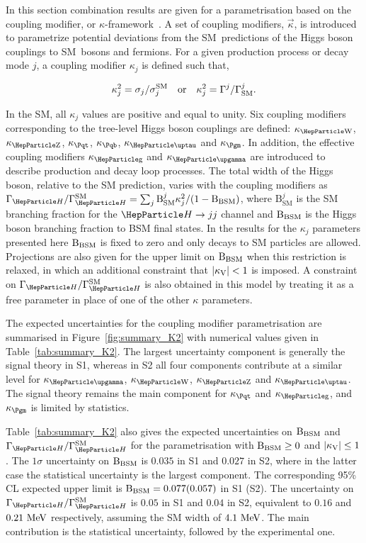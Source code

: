 
In this section combination results are given for a parametrisation based on the coupling modifier, or $\kappa$-framework~\cite{Heinemeyer:2013tqa}. A set of coupling modifiers, $\vec\kappa$, is introduced to parametrize potential deviations from the SM~predictions of the Higgs boson couplings to SM~bosons and fermions. For a given production process or decay mode $j$, a coupling modifier $\kappa_j$ is defined such that,

\begin{equation}
\label{eq:kappa}
  \kappa_j^2=\sigma_j/\sigma_j^\SM\ \ \ {\rm or}\ \ \  \kappa_j^2=\Gamma^j/\Gamma^j_\SM.
\end{equation}

In the SM, all $\kappa_j$ values are positive and equal to unity. Six coupling modifiers corresponding to the tree-level Higgs boson couplings are defined: $\kW$, $\kZ$, $\ktop$, $\kb$, $\ktau$ and $\kmu$. In addition, the effective coupling modifiers $\kglu$ and $\kgam$ are introduced to describe \ggh production and \hgg decay loop processes. The total width of the Higgs boson, relative to the SM prediction, varies with the coupling modifiers as $\GammaSM = \sum_{j}\mathrm{B}^{j}_{\text{SM}}\kappa_{j}^{2} / (1 - \Bbsm)$, where $\mathrm{B}^{j}_{\text{SM}}$ is the SM branching fraction for the $\PH\rightarrow jj$ channel and $\mathrm{B_{BSM}}$ is the Higgs boson branching fraction to BSM final states. In the results for the $\kappa_j$ parameters presented here $\mathrm{B_{BSM}}$ is fixed to zero and only decays to SM particles are allowed. Projections are also given for the upper limit on $\mathrm{B_{BSM}}$ when this restriction is relaxed, in which an additional constraint that $|\kappa_{\mathrm{V}}| < 1$ is imposed. A constraint on $\GammaSM$ is also obtained in this model by treating it as a free parameter in place of one of the other $\kappa$ parameters.

The expected uncertainties for the coupling modifier parametrisation are summarised in Figure~\ref{fig:summary_K2} with numerical values given in Table~\ref{tab:summary_K2}. The largest uncertainty component is generally the signal theory in S1, whereas in S2 all four components contribute at a similar level for $\kgam$, $\kW$, $\kZ$ and $\ktau$. The signal theory remains the main component for $\ktop$ and $\kglu$, and $\kmu$ is limited by statistics.

Table~\ref{tab:summary_K2} also gives the expected uncertainties on $\mathrm{B_{BSM}}$ and $\GammaSM$ for the parametrisation with $\mathrm{B_{BSM}}\geq0$ and $|\kappa_{\mathrm{V}}|\leq1$. The $1\sigma$ uncertainty on $\mathrm{B_{BSM}}$ is $0.035$ in S1 and $0.027$ in S2, where in the latter case the statistical uncertainty is the largest component. The corresponding 95\% CL expected upper limit is $\mathrm{B_{BSM}} = 0.077 (0.057)$ in S1 (S2). The uncertainty on $\GammaSM$ is $0.05$ in S1 and $0.04$ in S2, equivalent to $0.16$ and $0.21~\text{MeV}$ respectively, assuming the SM width of $4.1~\text{MeV}$. The main contribution is the statistical uncertainty, followed by the experimental one.

